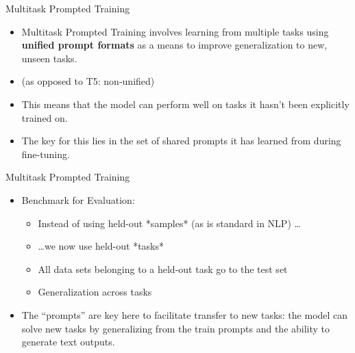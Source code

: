 \documentclass[11pt,compress,t,notes=noshow, xcolor=table]{beamer}
\begin{document}
\begin{frame}{Multitask Prompted
		Training}

\vfill

\begin{itemize}
    \item Multitask Prompted Training
    involves learning from multiple
    tasks using \textbf{unified prompt formats} as a means to improve
    generalization to new, unseen tasks.
    \item (as opposed to T5: non-unified)
    \item This means that the model can perform well on tasks it hasn't been explicitly trained on.
    \item The key for this lies in the set of shared prompts it has learned from during fine-tuning.
\end{itemize}

\vfill

\end{frame}


\begin{frame}{Multitask Prompted Training}

\vfill

\begin{itemize}
    \item Benchmark for Evaluation:
        \begin{itemize}
        \item Instead of using held-out *samples* (as is
        standard in NLP) \ldots
        \item \ldots we now use held-out *tasks*
            \item All data sets belonging to a held-out task go to the test set
            \item Generalization across tasks %
        \end{itemize}
    \item The ``prompts'' are key here to
facilitate
        transfer to new tasks:  the model can solve new
        tasks by generalizing from  the train prompts and the ability to generate text outputs.
\end{itemize}

\vfill

\end{frame}
\end{document}
